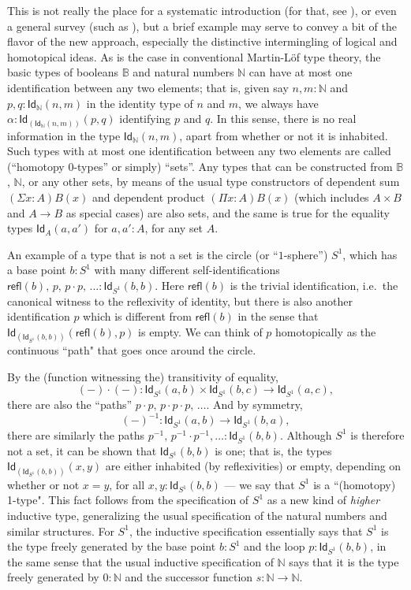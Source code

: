 \documentclass[11pt]{article}
\newcommand{\B}{\ensuremath{\mathbb{B}}}
\newcommand{\N}{\ensuremath{\mathbb{N}}}
\newcommand{\Id}{\mathsf{Id}}
\newcommand{\id}[1]{\Id_{#1}}
\newcommand{\refl}{\mathsf{refl}}
\theoremstyle{remark}
\theoremstyle{definition}
\begin{document}
This is not really the place for a systematic introduction (for that, see \cite{HoTTbook}), or even a general survey (such as \cite{apw,pw}), but a brief example may serve to convey a bit of the flavor of the new approach, especially the distinctive intermingling of logical and homotopical ideas.  As is the case in conventional Martin-L\"of type theory, the basic types of booleans $\B$ and natural numbers $\N$ can have at most one identification between any two elements; that is, given say $n, m : \N$ and $p,q: \id{\N}(n,m)$ in the identity type of $n$ and $m$, we always have $\alpha:\id{\left(\id{\N}(n,m)\right)}(p,q)$ identifying $p$ and $q$.  In this sense, there is no real information in the type $\id{\N}(n,m)$, apart from whether or not it is inhabited.  Such types with at most one identification between any two elements are called (``homotopy 0-types'' or simply) ``sets''.  Any types that can be constructed from $\B$, $\N$, or any other sets, by means of the usual type constructors of dependent sum $(\Sigma{x:A})B(x)$ and dependent product $(\Pi{x:A})B(x)$ (which includes $A\times B$ and $A\rightarrow B$ as special cases) are also sets, and the same is true for the equality types $\id{A}(a,a')$ for $a,a':A$, for any set $A$.  

 An example of a type that is not a set is the circle (or ``$1$-sphere'') $S^1$, which has a base point $b: S^1$ with many different self-identifications $\refl(b),\, p,\, p\cdot p,\, ... :\id{S^1}(b,b)$.  Here $\refl(b)$ is the trivial identification, i.e.\ the canonical witness to the reflexivity of identity, but there is also another identification $p$ which is different from $\refl(b)$ in the sense that $\id{\left(\id{S^1}(b,b)\right)}(\refl(b), p)$ is empty.  We can think of $p$ homotopically as the continuous ``path" that goes once around the circle. 

%
%
By the (function witnessing the) transitivity of equality, 
\[
(-)\cdot(-) : \id{S^1}(a,b) \times \id{S^1}(b,c)\to \id{S^1}(a,c),
\]
 there are also the ``paths'' $p\cdot p,\, p\cdot p\cdot p,\, \ldots$.   And by symmetry,
 \[
 (-)^{-1}:\id{S^1}(a,b) \to \id{S^1}(b,a),
 \]
 there are similarly the paths $p^{-1},\, p^{-1}\cdot p^{-1}, \ldots :\id{S^1}(b,b)$.  Although $S^1$ is therefore not a set, it can be shown that $\id{S^1}(b,b)$ is one; that is, the types $\id{\left(\id{S^1}(b,b)\right)}(x,y)$ are either inhabited (by reflexivities) or empty, depending on whether or not $x=y$, for all $x,y : \id{S^1}(b,b)$ --- we say that $S^1$ is a ``(homotopy) 1-type".  This fact follows from the specification of $S^1$ as a new kind of \emph{higher} inductive type, generalizing the usual specification of the natural numbers and similar structures.  For $S^1$, the inductive specification essentially says that $S^1$ is the type freely generated by the base point $b:S^1$ and the loop $p:\id{S^1}(b,b)$, in the same sense that the usual inductive specification of $\N$ says that it is the type freely generated by $0:\N$ and the successor function $s:\N\to\N$.  
  
\end{document}
